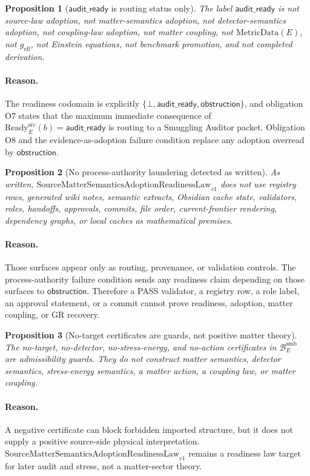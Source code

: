 \documentclass[11pt]{article}
\newcommand{\SMSAR}{\mathrm{SourceMatterSemanticsAdoptionReadinessLaw}_{v1}}
\newcommand{\BridgeDom}{\mathcal B^{\mathrm{smb}}_E}
\newcommand{\Ready}{\mathrm{Ready}^{\mathrm{src}}_E}
\newcommand{\AuditReady}{\mathsf{audit\_ready}}
\newcommand{\Obstruction}{\mathsf{obstruction}}
\newcommand{\Bottom}{\bot}
\newcommand{\MetricData}{\mathrm{MetricData}}
\newcommand{\geff}{g_{\mathrm{eff}}}
\newtheorem{proposition}{Proposition}
\begin{document}
\begin{proposition}[\(\AuditReady\) is routing status only]
The label \(\AuditReady\) is not source-law adoption, not matter-semantics
adoption, not detector-semantics adoption, not coupling-law adoption, not
matter coupling, not \(\MetricData(E)\), not \(\geff\), not Einstein equations,
not benchmark promotion, and not completed derivation.
\end{proposition}

\paragraph{Reason.}
The readiness codomain is explicitly
\(\{\Bottom,\AuditReady,\Obstruction\}\), and obligation O7 states that the
maximum immediate consequence of \(\Ready(b)=\AuditReady\) is routing to a
Smuggling Auditor packet. Obligation O8 and the evidence-as-adoption failure
condition replace any adoption overread by \(\Obstruction\).

\begin{proposition}[No process-authority laundering detected as written]
As written, \(\SMSAR\) does not use registry rows, generated wiki notes,
semantic extracts, Obsidian cache state, validators, roles, handoffs,
approvals, commits, file order, current-frontier rendering, dependency graphs,
or local caches as mathematical premises.
\end{proposition}

\paragraph{Reason.}
Those surfaces appear only as routing, provenance, or validation controls.
The process-authority failure condition sends any readiness claim depending on
those surfaces to \(\Obstruction\). Therefore a PASS validator, a registry row,
a role label, an approval statement, or a commit cannot prove readiness,
adoption, matter coupling, or GR recovery.

\begin{proposition}[No-target certificates are guards, not positive matter theory]
The no-target, no-detector, no-stress-energy, and no-action certificates in
\(\BridgeDom\) are admissibility guards. They do not construct matter
semantics, detector semantics, stress-energy semantics, a matter action,
a coupling law, or matter coupling.
\end{proposition}

\paragraph{Reason.}
A negative certificate can block forbidden imported structure, but it does not
supply a positive source-side physical interpretation. \(\SMSAR\) remains a
readiness law target for later audit and stress, not a matter-sector theory.
\end{document}
